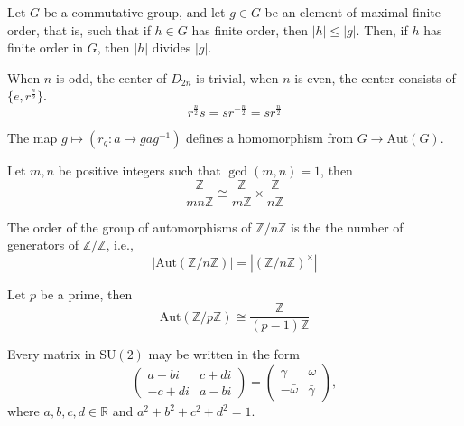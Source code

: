 \documentclass[openany]{book}
\newcommand{\Z}{\mathbb{Z}}
\begin{document}
\begin{prop}[1.15]
    Let \( G \) be a commutative group, and let \( g \in G \) be an element of maximal finite order, that is, such that if \( h \in G \) has finite order, then \( |h| \leq |g| \). Then, if \( h \) has finite order in \( G \), then \( |h| \) divides \( |g| \).
\end{prop}


\begin{prop}
    When $n$ is odd, the center of $D_{2n}$ is trivial, when $n$ is even, the center consists of $\{e, r^\frac{n}{2}\}$.
    \begin{equation*}
        r^\frac{n}{2}s=sr^{-\frac{n}{2}}=sr^\frac{n}{2}
    \end{equation*}
\end{prop}


\begin{prop}[4.8]
    The map $g\mapsto \left(r_g: a\mapsto gag^{-1}\right)$ defines a homomorphism from $G\to \text{Aut}(G)$.
\end{prop}


\begin{prop}[4.9]
    Let $m,n$ be positive integers such that $\gcd(m,n)=1$, then 
    \begin{equation*}
        \frac{\Z}{mn\Z}\cong\frac{\Z}{m\Z}\times\frac{\Z}{n\Z}
    \end{equation*}
\end{prop}


\begin{prop}[4.14]
    The order of the group of automorphisms of $\Z/n\Z$ is the the number of generators of $\Z/\Z$, i.e., 
    \begin{equation*}
        \left|\text{Aut}(\Z/n\Z)\right|=\left|(\Z/n\Z)^\times\right|
    \end{equation*}
\end{prop}

\begin{prop}[4.15]
    Let $p$ be a prime, then 
    \begin{equation*}
        \text{Aut}(\Z/p\Z)\cong\frac{\Z}{(p-1)\Z}
    \end{equation*}
\end{prop}

\begin{prop}[6.3]
    Every matrix in $\mathrm{SU}(2)$ may be written in the form
    \[
    \begin{pmatrix}
    a + bi & c + di \\
    -c + di & a - bi
    \end{pmatrix}=\begin{pmatrix}
        \gamma&\omega\\
        -\bar{\omega}&\bar{\gamma}
    \end{pmatrix},
    \]
    where $a, b, c, d \in \mathbb{R}$ and $a^2 + b^2 + c^2 + d^2 = 1$.
\end{prop}
\end{document}
